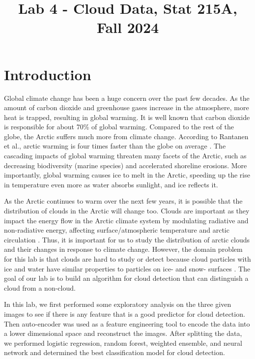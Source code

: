 \documentclass[11pt,letterpaper]{article}
\title{Lab 4 - Cloud Data, Stat 215A, Fall 2024\vspace{-2em}}
\begin{document}
\maketitle

\section{Introduction}
Global climate change has been a huge concern over the past few decades. As the amount of carbon dioxide and greenhouse gases increase in the atmosphere, more heat is trapped, resulting in global warming. It is well known that carbon dioxide is responsible for about 70\% of global warming. Compared to the rest of the globe, the Arctic suffers much more from climate change. According to Rantanen et al., arctic warming is four times faster than the globe on average \parencite{rantanen2022arctic}. The cascading impacts of global warming threaten many facets of the Arctic, such as decreasing biodiversity (marine species) and accelerated shoreline erosions. More importantly, global warming causes ice to melt in the Arctic, speeding up the rise in temperature even more as water absorbs sunlight, and ice reflects it.

As the Arctic continues to warm over the next few years, it is possible that the distribution of clouds in the Arctic will change too. Clouds are important as they impact the energy flow in the Arctic climate system by modulating radiative and non-radiative energy, affecting surface/atmospheric temperature and arctic circulation \parencite{taylor2023isolating}. Thus, it is important for us to study the distribution of arctic clouds and their changes in response to climate change. However, the domain problem for this lab is that clouds are hard to study or detect because cloud particles with ice and water have similar properties to particles on ice- and snow- surfaces \parencite{shi2008daytime}. The goal of our lab is to build an algorithm for cloud detection that can distinguish a cloud from a non-cloud.

In this lab, we first performed some exploratory analysis on the three given images to see if there is any feature that is a good predictor for cloud detection. Then auto-encoder was used as a feature engineering tool to encode the data into a lower dimensional space and reconstruct the images. After splitting the data, we performed logistic regression, random forest, weighted ensemble, and neural network and determined the best classification model for cloud detection.
\end{document}
